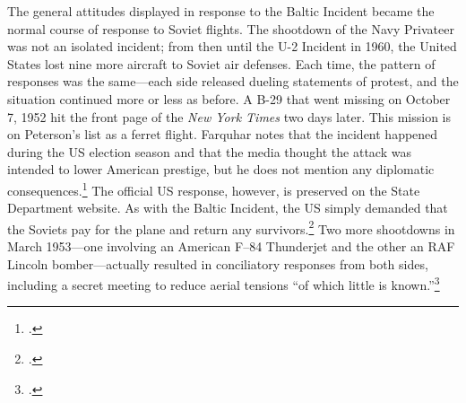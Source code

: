 \documentclass[14pt]{extarticle}
\begin{document}

The general attitudes displayed in response to the Baltic Incident became the normal course of response to Soviet flights. The shootdown of the Navy Privateer was not an isolated incident; from then until the U-2 Incident in 1960, the United States lost nine more aircraft to Soviet air defenses. Each time, the pattern of responses was the same---each side released dueling statements of protest, and the situation continued more or less as before. A B-29 that went missing on October 7, 1952 hit the front page of the \emph{New York Times} two days later. This mission is on Peterson's list as a ferret flight. Farquhar notes that the incident happened during the US election season and that the media thought the attack was intended to lower American prestige, but he does not mention any diplomatic consequences.\footcite[p.~43-44]{farquhar_aerial_2015} The official US response, however, is preserved on the State Department website. As with the Baltic Incident, the US simply demanded that the Soviets pay for the plane and return any survivors.\footcite{the_new_york_times_u.s._1952} Two more shootdowns in March 1953---one involving an American F–84 Thunderjet and the other an RAF Lincoln bomber---actually resulted in conciliatory responses from both sides, including a secret meeting to reduce aerial tensions \enquote{of which little is known.}\footcite[p.~45]{farquhar_aerial_2015}
\end{document}
